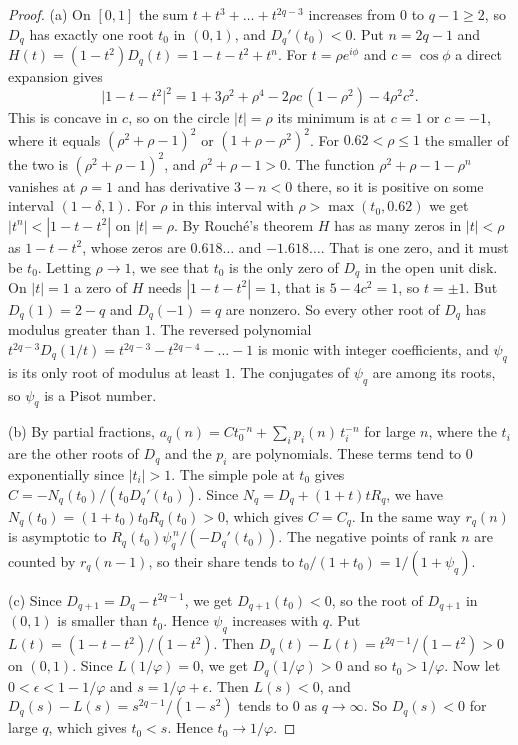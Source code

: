 \begin{proof}
(a) On $[0,1]$ the sum $t+t^3+\dots+t^{2q-3}$ increases from $0$ to $q-1\ge2$, so $D_q$ has exactly
one root $t_0$ in $(0,1)$, and $D_q'(t_0)<0$. Put $n=2q-1$ and $H(t)=(1-t^2)D_q(t)=1-t-t^2+t^n$. For
$t=\rho e^{i\phi}$ and $c=\cos\phi$ a direct expansion gives
\[
\bigl|1-t-t^2\bigr|^2=1+3\rho^2+\rho^4-2\rho c\,(1-\rho^2)-4\rho^2c^2 .
\]
This is concave in $c$, so on the circle $|t|=\rho$ its minimum is at $c=1$ or $c=-1$, where it equals
$(\rho^2+\rho-1)^2$ or $(1+\rho-\rho^2)^2$. For $0.62<\rho\le1$ the smaller of the two is
$(\rho^2+\rho-1)^2$, and $\rho^2+\rho-1>0$. The function $\rho^2+\rho-1-\rho^n$ vanishes at $\rho=1$ and has
derivative $3-n<0$ there, so it is positive on some interval $(1-\delta,1)$. For $\rho$ in this
interval with $\rho>\max(t_0,0.62)$ we get $|t^n|<|1-t-t^2|$ on $|t|=\rho$. By Rouch\'e's theorem $H$ has
as many zeros in $|t|<\rho$ as $1-t-t^2$, whose zeros are $0.618\ldots$ and $-1.618\ldots$. That is one
zero, and it must be $t_0$. Letting $\rho\to1$, we see that $t_0$ is the only zero of $D_q$ in the open
unit disk. On $|t|=1$ a zero of $H$ needs $|1-t-t^2|=1$, that is $5-4c^2=1$, so $t=\pm1$. But
$D_q(1)=2-q$ and $D_q(-1)=q$ are nonzero. So every other root of $D_q$ has modulus greater than $1$.
The reversed polynomial $t^{2q-3}D_q(1/t)=t^{2q-3}-t^{2q-4}-\dots-1$ is monic with integer coefficients,
and $\psi_q$ is its only root of modulus at least $1$. The conjugates of $\psi_q$ are among its roots,
so $\psi_q$ is a Pisot number.

(b) By partial fractions, $a_q(n)=Ct_0^{-n}+\sum_i p_i(n)\,t_i^{-n}$ for large $n$, where the $t_i$ are
the other roots of $D_q$ and the $p_i$ are polynomials. These terms tend to $0$ exponentially since
$|t_i|>1$. The simple pole at $t_0$ gives $C=-N_q(t_0)/(t_0D_q'(t_0))$. Since
$N_q=D_q+(1+t)tR_q$, we have $N_q(t_0)=(1+t_0)t_0R_q(t_0)>0$, which gives $C=C_q$. In the same way
$r_q(n)$ is asymptotic to $R_q(t_0)\psi_q^{\,n}/(-D_q'(t_0))$. The negative points of rank $n$ are
counted by $r_q(n-1)$, so their share tends to $t_0/(1+t_0)=1/(1+\psi_q)$.

(c) Since $D_{q+1}=D_q-t^{2q-1}$, we get $D_{q+1}(t_0)<0$, so the root of $D_{q+1}$ in $(0,1)$ is
smaller than $t_0$. Hence $\psi_q$ increases with $q$. Put $L(t)=(1-t-t^2)/(1-t^2)$. Then
$D_q(t)-L(t)=t^{2q-1}/(1-t^2)>0$ on $(0,1)$. Since $L(1/\varphi)=0$, we get $D_q(1/\varphi)>0$ and so
$t_0>1/\varphi$. Now let $0<\epsilon<1-1/\varphi$ and $s=1/\varphi+\epsilon$. Then $L(s)<0$, and
$D_q(s)-L(s)=s^{2q-1}/(1-s^2)$ tends to $0$ as $q\to\infty$. So $D_q(s)<0$ for large $q$, which gives
$t_0<s$. Hence $t_0\to1/\varphi$.
\end{proof}

